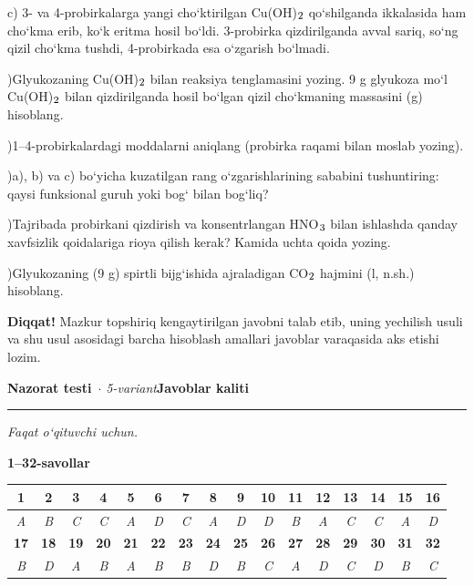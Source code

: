 \documentclass[11pt,a4paper]{article}
\renewcommand{\textsubscript}[1]{\ensuremath{_{\text{\fontsize{8}{8}\selectfont #1}}}}
\newcommand{\diqqat}[1]{\par\smallskip\noindent\textbf{Diqqat!} #1\par\medskip}
\begin{document}
c) 3- va 4-probirkalarga yangi cho`ktirilgan Cu(OH)\textsubscript{2} qo`shilganda ikkalasida ham cho`kma erib, ko`k eritma hosil bo`ldi. 3-probirka qizdirilganda avval sariq, so`ng qizil cho`kma tushdi, 4-probirkada esa o`zgarish bo`lmadi.\par
{})Glyukozaning Cu(OH)\textsubscript{2} bilan reaksiya tenglamasini yozing. 9 g glyukoza mo`l Cu(OH)\textsubscript{2} bilan qizdirilganda hosil bo`lgan qizil cho`kmaning massasini (g) hisoblang.\par
{})1--4-probirkalardagi moddalarni aniqlang (probirka raqami bilan moslab yozing).\par
{})a), b) va c) bo`yicha kuzatilgan rang o`zgarishlarining sababini tushuntiring: qaysi funksional guruh yoki bog` bilan bog`liq?\par
{})Tajribada probirkani qizdirish va konsentrlangan HNO\textsubscript{3} bilan ishlashda qanday xavfsizlik qoidalariga rioya qilish kerak? Kamida uchta qoida yozing.\par
{})Glyukozaning (9 g) spirtli bijg`ishida ajraladigan CO\textsubscript{2} hajmini (l, n.sh.) hisoblang.\par
\diqqat{Mazkur topshiriq kengaytirilgan javobni talab etib, uning yechilish usuli va shu usul asosidagi barcha hisoblash amallari javoblar varaqasida aks etishi lozim.}
\newpage
\noindent\textbf{\fontsize{13}{15}\selectfont Nazorat testi}\ \textit{$\cdot$ 5-variant}\hfill \textbf{Javoblar kaliti}\par\smallskip\hrule\smallskip
\textit{Faqat o`qituvchi uchun.}\par\medskip
\noindent\textbf{1--32-savollar}\par\smallskip
\noindent\begin{tabular}{|c|c|c|c|c|c|c|c|c|c|c|c|c|c|c|c|}\hline
\textbf{1} & \textbf{2} & \textbf{3} & \textbf{4} & \textbf{5} & \textbf{6} & \textbf{7} & \textbf{8} & \textbf{9} & \textbf{10} & \textbf{11} & \textbf{12} & \textbf{13} & \textbf{14} & \textbf{15} & \textbf{16}\\\hline
\textsl{A} & \textsl{B} & \textsl{C} & \textsl{C} & \textsl{A} & \textsl{D} & \textsl{C} & \textsl{A} & \textsl{D} & \textsl{D} & \textsl{B} & \textsl{A} & \textsl{C} & \textsl{C} & \textsl{A} & \textsl{D}\\\hline
\textbf{17} & \textbf{18} & \textbf{19} & \textbf{20} & \textbf{21} & \textbf{22} & \textbf{23} & \textbf{24} & \textbf{25} & \textbf{26} & \textbf{27} & \textbf{28} & \textbf{29} & \textbf{30} & \textbf{31} & \textbf{32}\\\hline
\textsl{B} & \textsl{D} & \textsl{A} & \textsl{B} & \textsl{A} & \textsl{B} & \textsl{B} & \textsl{D} & \textsl{B} & \textsl{C} & \textsl{A} & \textsl{D} & \textsl{C} & \textsl{D} & \textsl{B} & \textsl{C}\\\hline
\end{tabular}\par\medskip
\end{document}
